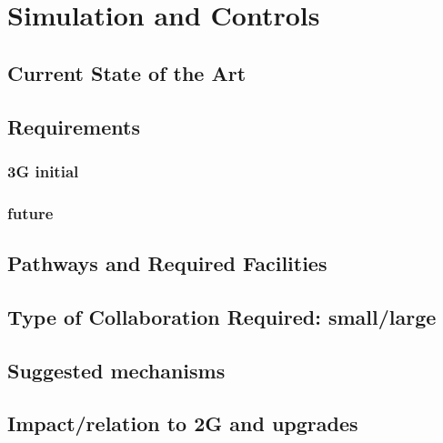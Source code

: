 \section{Simulation and Controls}
\label{sec:SimControls}

\subsection{Current State of the Art}

\subsection{Requirements}
\subsubsection{3G initial}
\subsubsection{future}

\subsection{Pathways and Required Facilities}

\subsection{Type of Collaboration Required:  small/large}

\subsection{Suggested mechanisms}

\subsection{Impact/relation to 2G and upgrades}

